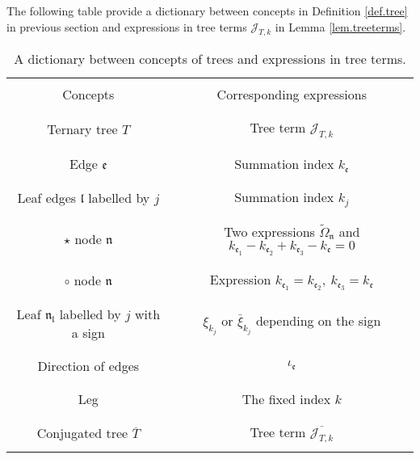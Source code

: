 The following table provide a dictionary between concepts in Definition \ref{def.tree} in previous section and expressions in tree terms $\mathcal{J}_{T,k}$ in Lemma \ref{lem.treeterms}.

\begin{table}[h]
\begin{center}
    \begin{longtable}{|c|c|}
    \hline
          &   \\
     Concepts    &  Corresponding expressions \\
          &   \\
    \hline
          &   \\
     Ternary tree $T$    &  Tree term $\mathcal{J}_{T,k}$\\
          &   \\
    \hline
          &   \\
     Edge $\mathfrak{e}$    &  Summation index $k_{\mathfrak{e}}$\\
          &   \\
    \hline
              &   \\
     Leaf edges $\mathfrak{l}$ labelled by $j$    &  Summation index $k_{j}$\\
          &   \\
    \hline
                 &   \\
     $\star$ node $\mathfrak{n}$    & Two expressions $\widetilde{\Omega}_{\mathfrak{n}}$ and $k_{\mathfrak{e}_1}-k_{\mathfrak{e}_2}+k_{\mathfrak{e}_3}-k_{\mathfrak{e}}=0$\\
          &   \\
    \hline
                 &   \\
     $\circ$ node $\mathfrak{n}$    &   Expression $k_{\mathfrak{e}_1}=k_{\mathfrak{e}_2},\ k_{\mathfrak{e}_3}=k_{\mathfrak{e}}$\\
          &   \\
    \hline
                 &   \\
     Leaf $\mathfrak{n}_{\mathfrak{l}}$ labelled by $j$ with a sign  &  $\xi_{k_j}$ or $\bar{\xi}_{k_j}$ depending on the sign\\
          &   \\
    \hline
                 &   \\
     Direction of edges    &  $\iota_{\mathfrak{e}}$\\
          &   \\
    \hline
                 &   \\
     Leg    &  The fixed index $k$\\
          &   \\
    \hline
                 &   \\
     Conjugated tree $\overline{T}$    &  Tree term $\overline{\mathcal{J}_{T,k}}$ \\
          &   \\
    \hline
    \end{longtable}
\end{center}
\caption{\label{tab.dict} A dictionary between concepts of trees and expressions in tree terms.}
\end{table}

